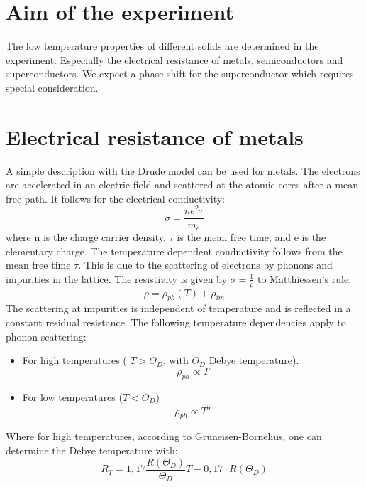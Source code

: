 
\section{Aim of the experiment}
The low temperature properties of different solids are determined in the experiment. Especially the electrical resistance of metals, semiconductors and superconductors. We expect a phase shift for the superconductor which requires special consideration. 

\section{Electrical resistance of metals}


A simple description with the Drude model can be used for metals. The electrons are accelerated in an electric field and scattered at the atomic cores after a mean free path. It follows for the electrical conductivity:
\begin{equation}
    \sigma = \frac{ne^2\tau}{m_e}
\end{equation}
where n is the charge carrier density, $\tau$ is the mean free time, and e is the elementary charge. The temperature dependent conductivity follows from the mean free time $\tau$. This is due to the scattering of electrons by phonons and impurities in the lattice. The resistivity is given by $\sigma =\frac{1}{\rho}$ to Matthiessen's rule:
\begin{equation}
    \rho = \rho_{ph}(T) + \rho_{im}
\end{equation}
The scattering at impurities is independent of temperature and is reflected in a constant residual resistance. The following temperature dependencies apply to phonon scattering:
\begin{itemize}
    \item For high temperatures ( $T > \Theta_D$, with $\Theta_D$ Debye temperature).
    \begin{equation}
        \rho_{ph} \propto T
    \end{equation}
   \item For low temperatures ($T<\Theta_D$) 
    \begin{equation}
        \rho_{ph} \propto T^5
    \end{equation}
    
\end{itemize}
Where for high temperatures, according to Grüneisen-Bornelius, one can determine the Debye temperature with:
\begin{equation}
	\label{eq:HT}
    R_T = 1,17\frac{R(\Theta_D)}{\Theta_D} T-0,17\cdot R(\Theta_D)
\end{equation}



